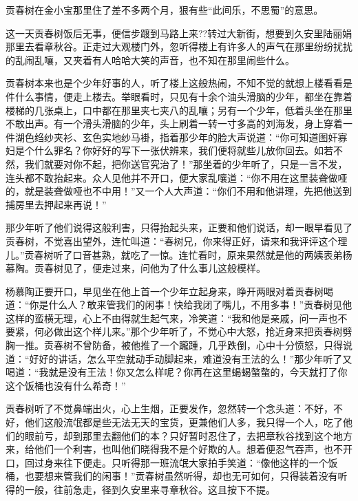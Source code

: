 \documentclass[12pt,UTF8]{ctexbook}
\begin{document}
{{{贡春树在金小宝那里住了差不多两个月，狠有些“此间乐，不思蜀”的意思。

这一天贡春树饭后无事，便信步踱到马路上来??转过大新街，想要到久安里陆丽娟那里去看章秋谷。正走过大观楼门外，忽听得楼上有许多人的声气在那里纷纷扰扰的乱闹乱嚷，又夹着有人哈哈大笑的声音，也不知在那里闹些什么。

贡春树本来也是个少年好事的人，听了楼上这般热闹，不知不觉的就想上楼看看是件什么事情，便走上楼去。举眼看时，只见有十余个油头滑脑的少年，都坐在靠着楼梯的几张桌上，口中都在那里夹七夹八的乱嚷；另有一个少年，低着头坐在那里不敢出声。有一个滑头滑脑的少年，头上刷着一转一寸多高的刘海发，身上穿着一件湖色绉纱夹衫、玄色实地纱马褂，指着那少年的脸大声说道：“你可知道图奸寡妇是个什么罪名？你好好的写下一张伏辨来，我们便将就些儿放你回去。如若不然，我们就要对你不起，把你送官究治了！”那坐着的少年听了，只是一言不发，连头都不敢抬起来。众人见他并不开口，便大家乱嚷道：“你不用在这里装聋做哑的，就是装聋做哑也不中用！”又一个人大声道：“你们不用和他讲理，先把他送到捕房里去押起来再说！”

那少年听了他们说得这般利害，只得抬起头来，正要和他们说话，却一眼早看见了贡春树，不觉喜出望外，连忙叫道：“春树兄，你来得正好，请来和我评评这个理儿。”贡春树听了口音甚熟，就吃了一惊。连忙看时，原来果然就是他的两姨表弟杨慕陶。贡春树见了，便走过来，问他为了什么事儿这般模样。

杨慕陶正要开口，早见坐在他上首一个少年立起身来，睁开两眼对着贡春树喝道：“你是什么人？敢来管我们的闲事！快给我闭了嘴儿，不用多事！”贡春树见他这样的蛮横无理，心上不由得就生起气来，冷笑道：“我和他是亲戚，问一声也不要紧，何必做出这个样儿来。”那个少年听了，不觉心中大怒，抢近身来把贡春树劈胸一推。贡春树不曾防备，被他推了一个躘踵，几乎跌倒，心中十分愤怒，只得说道：“好好的讲话，怎么平空就动手动脚起来，难道没有王法的么！”那少年听了又喝道：“我就是没有王法！你又怎么样呢？你再在这里蝎蝎螫螫的，今天就打了你这个饭桶也没有什么希奇！”

贡春树听了不觉鼻端出火，心上生烟，正要发作，忽然转一个念头道：不好，不好，他们这般流氓都是些无法无天的宝货，更兼他们人多，我只得一个人，吃了他们的眼前亏，却到那里去翻他们的本？只好暂时忍住了，去把章秋谷找到这个地方来，给他们一个利害，也叫他们晓得我不是个好欺的人。想着便忍气吞声，也不开口，回过身来往下便走。只听得那一班流氓大家拍手笑道：“像他这样的一个饭桶，也要想来管我们的闲事！”贡春树虽然听得，却也无可如何，只得装着没有听得的一般，往前急走，径到久安里来寻章秋谷。这且按下不提。

}}}
\end{document}
